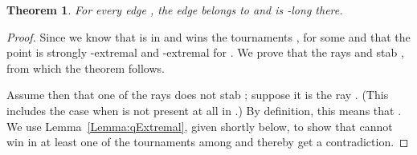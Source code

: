 \documentclass[letter,11pt]{article}
\newtheorem{theorem}{Theorem}[section]
\begin{document}
\begin{theorem}\label{Thm:Soundness}
For every edge , the edge  belongs to  and is -long there.
\end{theorem}
\begin{proof}


Since  we know that  is in  and wins the tournaments
, for some  and
that the point  is strongly -extremal and -extremal for . 
We prove that the rays  and  stab ,
from which the theorem follows.

Assume then that
 one of the rays  does not stab
 ; suppose it is the ray . (This includes the case when  is not present at
 all in .)  By definition, this means that
 . We use Lemma~\ref{Lemma:qExtremal}, given shortly below, to show that
  cannot win in at least one of the tournaments among
  and thereby get a
 contradiction.



\end{proof}
\end{document}
